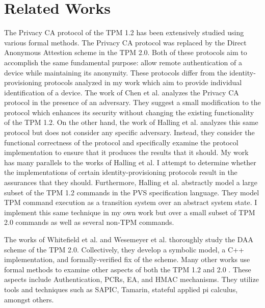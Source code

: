 
\section{Related Works}


The Privacy CA protocol of the TPM 1.2 has been extensively studied using various formal methods. The Privacy CA protocol was replaced by the Direct Anonymous Attestion scheme in the TPM 2.0. Both of these protocols aim to accomplish the same fundamental purpose: allow remote authentication of a device while maintaining its anonymity. These protocols differ from the identity-provisioning protocols analyzed in my work which aim to provide individual identification of a device.
The work of Chen et al. \cite{PrivacyCAAnalysis-Chen} analyzes the Privacy CA protocol in the presence of an adversary. They suggest a small modification to the protocol which enhances its security without changing the existing functionality of the TPM 1.2. 
On the other hand, the work of Halling et al. \cite{PrivacyCAAnalysis-Hall,TPM12Model} analyzes this same protocol but does not consider any specific adversary. Instead, they consider the functional correctness of the protocol and specifically examine the protocol implementation to ensure that it produces the results that it should.  
My work has many parallels to the works of Halling et al. 
I attempt to determine whether the implementations of certain identity-provisioning protocols result in the assurances that they should.
Furthermore, Halling et al. abstractly model a large subset of the TPM 1.2 commands in the PVS specification language. They model TPM command execution as a transition system over an abstract system state. I implement this same technique in my own work but over a small subset of TPM 2.0 commands as well as several non-TPM commands. 

The works of Whitefield et al. \cite{DAAAnalysis-Whit} and Wesemeyer et al. \cite{DAAAnalysis-Wes} thoroughly study the DAA scheme of the TPM 2.0. Collectively, they develop a symbolic model, a C++ implementation, and formally-verified fix of the scheme. 
Many other works use formal methods to examine other aspects of both the TPM 1.2 \cite{AuthAnalysis,PCRAnalysis} and 2.0 \cite{EAAnalysis,HMACAnalysis}.
These aspects include Authentication, PCRs, EA, and HMAC mechanisms. They utilize tools and techniques such as SAPIC, Tamarin, stateful applied pi calculus, amongst others.




